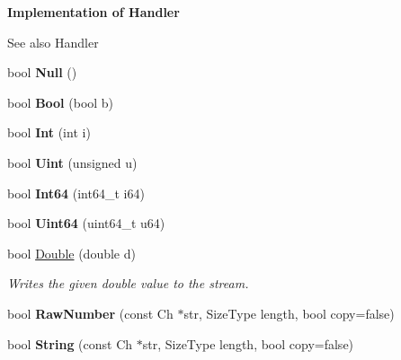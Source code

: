 \begin{Indent}{\bf Implementation of Handler}\par
{\em \begin{DoxySeeAlso}{See also}
Handler 
\end{DoxySeeAlso}
}\begin{DoxyCompactItemize}
\item 
bool {\bfseries Null} ()\hypertarget{class_writer_af700ed03c8810d48a4aaa3c5baeaf26c}{}\label{class_writer_af700ed03c8810d48a4aaa3c5baeaf26c}

\item 
bool {\bfseries Bool} (bool b)\hypertarget{class_writer_ad7491f4dedb02e7456b240b23ef8c1ad}{}\label{class_writer_ad7491f4dedb02e7456b240b23ef8c1ad}

\item 
bool {\bfseries Int} (int i)\hypertarget{class_writer_ad471415aa7741e732bab0bcfbb9522a8}{}\label{class_writer_ad471415aa7741e732bab0bcfbb9522a8}

\item 
bool {\bfseries Uint} (unsigned u)\hypertarget{class_writer_a5fb0c3228f89f6f9bef15f3e6e6f1739}{}\label{class_writer_a5fb0c3228f89f6f9bef15f3e6e6f1739}

\item 
bool {\bfseries Int64} (int64\+\_\+t i64)\hypertarget{class_writer_a4144d7086ed9d3d807c373de242bde45}{}\label{class_writer_a4144d7086ed9d3d807c373de242bde45}

\item 
bool {\bfseries Uint64} (uint64\+\_\+t u64)\hypertarget{class_writer_a55bb9f286ecdaf4cdb07bddb02e0cb2d}{}\label{class_writer_a55bb9f286ecdaf4cdb07bddb02e0cb2d}

\item 
bool \hyperlink{class_writer_a22a43e8a7193105deec6b808736f7a1a}{Double} (double d)
\begin{DoxyCompactList}\small\item\em Writes the given {\ttfamily double} value to the stream. \end{DoxyCompactList}\item 
bool {\bfseries Raw\+Number} (const Ch $\ast$str, Size\+Type length, bool copy=false)\hypertarget{class_writer_ad462dc606fddea0f34fc0e190c3bdaee}{}\label{class_writer_ad462dc606fddea0f34fc0e190c3bdaee}

\item 
bool {\bfseries String} (const Ch $\ast$str, Size\+Type length, bool copy=false)\hypertarget{class_writer_a8b4dc44f471403a83c9959575796ceab}{}\label{class_writer_a8b4dc44f471403a83c9959575796ceab}


\end{DoxyCompactItemize}
\end{Indent}
